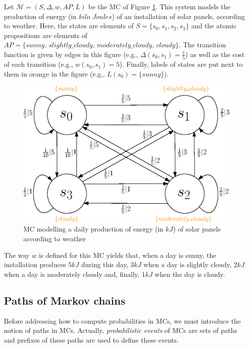 \begin{example}\label{solar-panel}
  Let $\mathcal{M} = (S, \Delta, w, AP, L)$ be the MC of Figure \ref{MCexample}. This system models the production of energy (in $kilo$ $Joules$) of
  an installation of solar panels, according to weather.
  Here, the states are elements of $S = \{s_0, s_1, s_2, s_3\}$ and the atomic propositions are elements of $AP = \{sunny, \, slightly\_cloudy, \, moderately\_cloudy, \, cloudy \}$. The transition function is given by edges in this figure (e.g., $\Delta(s_0, s_1) = \frac{1}{5}$) as well as the
  cost of each transition (e.g., $w(s_0, s_1) = 5$). Finally, labels of states
  are put next to them in orange in the figure (e.g., $L(s_0) = \{sunny\}$).
  \begin{figure}[h!]
    \centering
    \captionsetup{justification=centering}
    \includegraphics[width=0.6\linewidth]{resources/weather-solar-pannel}
    \caption{MC modelling a daily production of energy (in $kJ$) of solar panels according to weather}
    \label{MCexample}
  \end{figure}
  The way $w$ is defined for this MC yields that, when a day is sunny, the installation produces $5 kJ$ during this day, $3 kJ$ when a day is slightly cloudy, $2 kJ$ when a day is moderately cloudy and, finally, $1 kJ$ when the day is cloudy.
\end{example}

\subsection{Paths of Markov chains}
Before addressing how to compute probabilities in MCs, we must introduce the notion of paths in MCs. Actually, \textit{probabilistic events} of MCs are sets of paths and prefixes of these paths are used to define these events.

